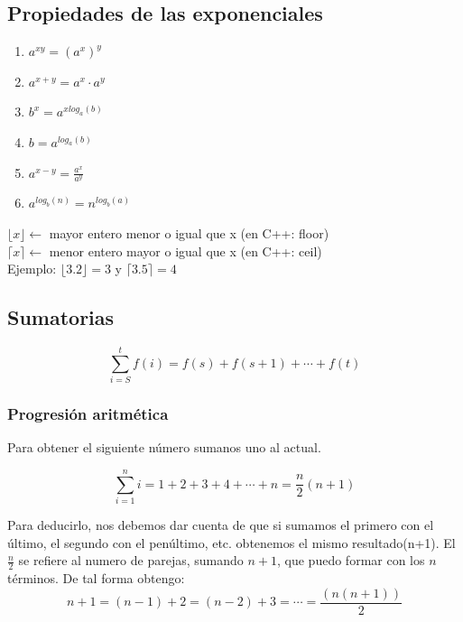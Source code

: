 \documentclass[10pt,a4paper,spanish]{report}
\begin{document}
\subsection{\textcolor[rgb]{0.1,0.2,0.6}Propiedades de las exponenciales}
\begin{enumerate}[$\rightarrow$]
\item $a^{xy} = (a^{x})^{y}$
\item $a^{x+y} = a^{x} \cdot a^{y}$
\item $b^{x} = a^{xlog_{a}(b)}$
\item $b = a^{log_{a}(b)}$
\item $a^{x-y} = \frac{a^{x}}{a^{y}}$
\item $a^{log_{b}(n)} = n^{log_{b}(a)}$
\end{enumerate}

\noindent
$\lfloor x \rfloor \longleftarrow$ mayor entero menor o igual que x (en C++: floor)\\
$\lceil x \rceil \longleftarrow$ menor entero mayor o igual que x (en C++: ceil)\\
Ejemplo: $\lfloor 3.2 \rfloor = 3$ y $\lceil 3.5 \rceil = 4$

\subsection{\textcolor[rgb]{0.1,0.2,0.6}Sumatorias}
\begin{displaymath}
\sum_{i=S}^t f(i) = f(s) + f(s+1) + \cdots + f(t)
\end{displaymath}

\subsubsection{\textcolor[rgb]{0.1,0.2,0.6}Progresión aritmética}
\noindent
Para obtener el siguiente número sumanos uno al actual.

\begin{center}
\begin{displaymath}
\sum_{i=1}^n i = 1+2+3+4+ \cdots + n = \frac{n}{2}(n+1)
\end{displaymath}

Para deducirlo, nos debemos dar cuenta de que si sumamos el primero con el último, el segundo con el penúltimo, etc. obtenemos el mismo resultado(n+1). 
El $\frac{n}{2}$ se refiere al  numero de parejas,  sumando $n+1$,  que puedo formar con los $n$ términos. De tal forma obtengo:
\begin{displaymath}
n + 1 = (n-1) + 2 = (n-2) + 3 = \cdots = \frac{(n(n+1))}{2}
\end{displaymath}
\end{center}
\end{document}
